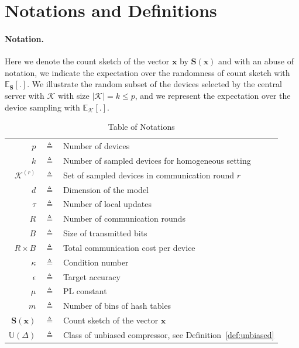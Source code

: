 \documentclass{article} %
\begin{document}
\section{Notations and Definitions}\label{app:notations}

\paragraph{Notation.} Here we denote the count sketch of the vector $\boldsymbol{x}$ by $\mathbf{S}(\boldsymbol{x})$ and with an abuse of notation, we indicate the expectation over the randomness of count sketch with $\mathbb{E}_{\mathbf{S}}[.]$. 
We illustrate the random subset of the devices selected by the central server with $\mathcal{K}$ with size $|\mathcal{K}|=k\leq p$, and we represent the expectation over the device sampling with $\mathbb{E}_{\mathcal{K}}[.]$. 


\begin{table}[htbp]\caption{Table of Notations}
\begin{center}%
\begin{tabular}{r c p{10cm} }
\toprule
$p$ & $\triangleq$ & Number of devices\\
$k$ & $\triangleq$ & Number of sampled devices for homogeneous setting\\
$\mathcal{K}^{(r)}$ & $\triangleq$ & Set of sampled devices in communication round $r$\\
$d$ & $\triangleq$ &  Dimension of the model \\
$\tau$ & $\triangleq$ & Number of local updates\\
$R$ & $\triangleq$ & Number of communication rounds\\
$B$ & $\triangleq$ &  Size of transmitted bits \\
$R\times B$ & $\triangleq$ &  Total communication cost per device \\
$\kappa$ & $\triangleq$ & Condition number\\
$\epsilon$ & $\triangleq$ & Target accuracy\\
$\mu$ & $\triangleq$ & PL constant \\
$m$ & $\triangleq$ &  Number of bins of hash tables \\
 $\mathbf{S}(\boldsymbol{x})$  & $\triangleq$ &  Count sketch of the vector $\boldsymbol{x}$\\
 $\mathbb{U}(\Delta)$  & $\triangleq$ &  Class of unbiased compressor, see Definition~\ref{def:unbiased}\\
\bottomrule
\end{tabular}
\end{center}
\label{tab:notations}
\end{table}
\end{document}
